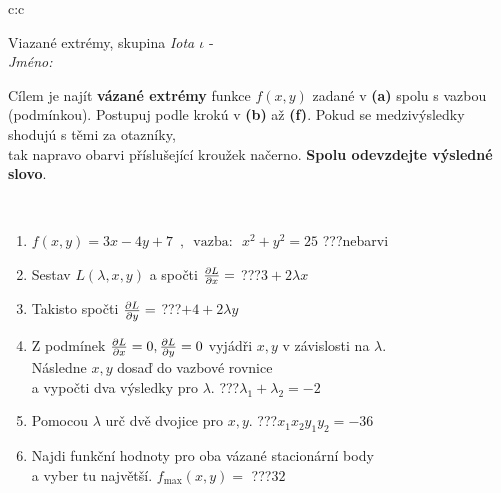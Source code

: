 \documentclass[10pt]{report}
\begin{document}
\begin{tabular}{c:c}
\begin{minipage}[c][104.5mm][t]{0.5\linewidth}
\begin{center}
\vspace{7mm}
{\huge Viazané extrémy, skupina \textit{Iota $\iota$} -}\\[5mm]
\textit{Jméno:}\phantom{xxxxxxxxxxxxxxxxxxxxxxxxxxxxxxxxxxxxxxxxxxxxxxxxxxxxxxxxxxxxxxxxx}\\[5mm]
\begin{minipage}{0.95\linewidth}
\begin{center}
Cílem je najít \textbf{vázané extrémy} funkce $f(x,y)$ zadané v \textbf{(a)} spolu s vazbou (podmínkou). Postupuj podle krokú v \textbf{(b)} až \textbf{(f)}. Pokud se medzivýsledky shodujú s těmi za otazníky,\\tak napravo obarvi příslušející kroužek načerno. \textbf{Spolu odevzdejte výsledné slovo}.
\end{center}
\end{minipage}
\\[1mm]
\begin{minipage}{0.79\linewidth}
\begin{center}
\begin{varwidth}{\linewidth}
\begin{enumerate}
\normalsize
\item $f(x,y)=3x-4y+7 \enspace , \enspace \mathrm{vazba:} \enspace x^2+y^2=25$\quad \dotfill\; ???\;\dotfill \quad nebarvi
\item Sestav $L(\lambda,x,y)$ a spočti $\pdv{L}{x}=$\quad \dotfill\; ???\;\dotfill \quad $3+2\lambda x$
\item Takisto spočti $\pdv{L}{y}=$\quad \dotfill\; ???\;\dotfill \quad $+4+2\lambda y$
\item Z podmínek $\pdv{L}{x}=0 , \pdv{L}{y}=0$ vyjádři $x,y$ v závislosti na $\lambda$.\\ \phantom{xxxxxx}Následne $x,y$ dosaď do vazbové rovnice\\ \phantom{xxxxxx}a vypočti dva výsledky pro $\lambda$.\quad \dotfill\; ???\;\dotfill \quad $\lambda_1+\lambda_2=-2$
\item Pomocou $\lambda$ urč dvě dvojice pro $x,y$.\quad \dotfill\; ???\;\dotfill \quad $x_1 x_2 y_1 y_2=-36$
\item Najdi funkční hodnoty pro oba vázané stacionární body\\ \phantom{xxxxxx}a vyber tu najvětší. $f_{\text{max}}(x,y)=$\quad \dotfill\; ???\;\dotfill \quad $32$

\end{enumerate}
\end{varwidth}
\end{center}
\end{minipage}
\end{center}
\end{minipage}
\end{tabular}
\end{document}
